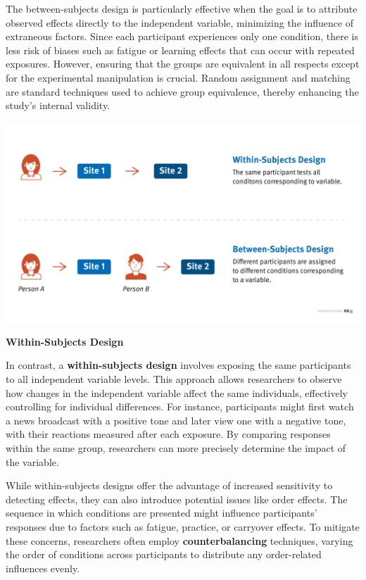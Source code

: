 \documentclass[
]{book}
\begin{document}
The between-subjects design is particularly effective when the goal is to attribute observed effects directly to the independent variable, minimizing the influence of extraneous factors. Since each participant experiences only one condition, there is less risk of biases such as fatigue or learning effects that can occur with repeated exposures. However, ensuring that the groups are equivalent in all respects except for the experimental manipulation is crucial. Random assignment and matching are standard techniques used to achieve group equivalence, thereby enhancing the study's internal validity.

\href{https://www.nngroup.com/articles/between-within-subjects/}{\includegraphics[width=1\textwidth,height=\textheight]{images/subject-design-graphic.jpg}}

\textbf{Within-Subjects Design}

In contrast, a \textbf{within-subjects design} involves exposing the same participants to all independent variable levels. This approach allows researchers to observe how changes in the independent variable affect the same individuals, effectively controlling for individual differences. For instance, participants might first watch a news broadcast with a positive tone and later view one with a negative tone, with their reactions measured after each exposure. By comparing responses within the same group, researchers can more precisely determine the impact of the variable.

While within-subjects designs offer the advantage of increased sensitivity to detecting effects, they can also introduce potential issues like order effects. The sequence in which conditions are presented might influence participants' responses due to factors such as fatigue, practice, or carryover effects. To mitigate these concerns, researchers often employ \textbf{counterbalancing} techniques, varying the order of conditions across participants to distribute any order-related influences evenly.
\end{document}
